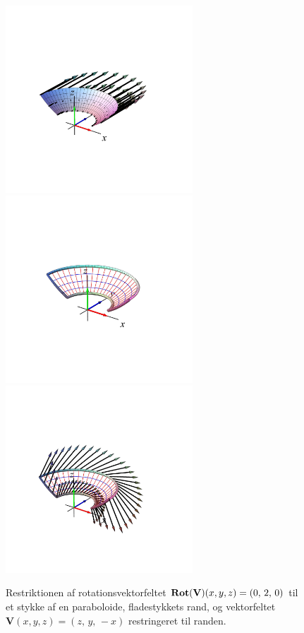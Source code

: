 \begin{figure}[h]
\centerline{\includegraphics[height=70mm]{FIGS/plotParab4}\includegraphics[height=70mm]{FIGS/plotParab5}\includegraphics[height=70mm]{FIGS/plotParab6}}
\begin{center}
\caption{\small{Restriktionen af  rotationsvektorfeltet $\operatorname{\mathbf{Rot}}(\mathbf{V})(x,y,z)= (0, \, 2, \, 0)$ til et stykke af en paraboloide, fladestykkets rand, og vektorfeltet $\mathbf{V}(x,y,z) = (z, \,y, \, -x)$ restringeret til randen.}}
\label{figParabB}
\end{center}
\end{figure}




